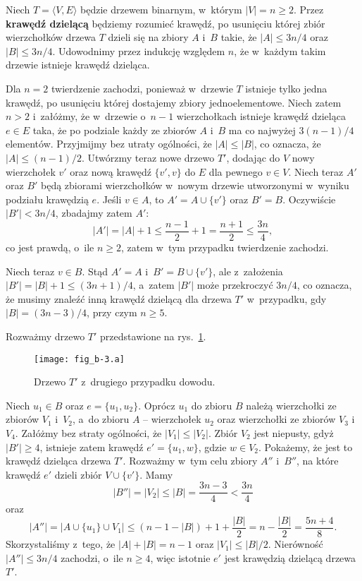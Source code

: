 
\subproblem %
Niech $T=\langle V,E\rangle$ będzie drzewem binarnym, w~którym $|V|=n\ge2$.
Przez \textbf{krawędź dzielącą} będziemy rozumieć krawędź, po usunięciu której zbiór wierzchołków drzewa $T$ dzieli się na zbiory $A$ i~$B$ takie, że $|A|\le3n/4$ oraz $|B|\le3n/4$.
Udowodnimy przez indukcję względem $n$, że w~każdym takim drzewie istnieje krawędź dzieląca.

Dla $n=2$ twierdzenie zachodzi, ponieważ w~drzewie $T$ istnieje tylko jedna krawędź, po usunięciu której dostajemy zbiory jednoelementowe.
Niech zatem $n>2$ i~załóżmy, że w~drzewie o~$n-1$ wierzchołkach istnieje krawędź dzieląca $e\in E$ taka, że po podziale każdy ze zbiorów $A$ i~$B$ ma co najwyżej $3(n-1)/4$ elementów.
Przyjmijmy bez utraty ogólności, że $|A|\le|B|$, co oznacza, że $|A|\le(n-1)/2$.
Utwórzmy teraz nowe drzewo $T'$, dodając do $V$ nowy wierzchołek $v'$ oraz nową krawędź $\{v',v\}$ do $E$ dla pewnego $v\in V$.
Niech teraz $A'$ oraz $B'$ będą zbiorami wierzchołków w~nowym drzewie utworzonymi w~wyniku podziału krawędzią $e$.
Jeśli $v\in A$, to $A'=A\cup\{v'\}$ oraz $B'=B$.
Oczywiście $|B'|<3n/4$, zbadajmy zatem $A'$:
\[
	|A'| = |A|+1 \le \frac{n-1}{2}+1 = \frac{n+1}{2} \le \frac{3n}{4},
\]
co jest prawdą, o~ile $n\ge2$, zatem w~tym przypadku twierdzenie zachodzi.

Niech teraz $v\in B$.
Stąd $A'=A$ i~$B'=B\cup \{v'\}$, ale z~założenia $|B'|=|B|+1\le(3n+1)/4$, a~zatem $|B'|$ może przekroczyć $3n/4$, co oznacza, że musimy znaleźć inną krawędź dzielącą dla drzewa $T'$ w~przypadku, gdy $|B|=(3n-3)/4$, przy czym $n\ge5$.

Rozważmy drzewo $T'$ przedstawione na rys.\ \ref{fig:B-3a}.
\begin{figure}[ht]
	\begin{center}
		\texttt{[image: fig\_b-3.a]}
	\end{center}
	\caption{Drzewo $T'$ z~drugiego przypadku dowodu.} \label{fig:B-3a}
\end{figure}
Niech $u_1\in B$ oraz $e=\{u_1,u_2\}$.
Oprócz $u_1$ do zbioru $B$ należą wierzchołki ze zbiorów $V_1$ i~$V_2$, a~do zbioru $A$ -- wierzchołek $u_2$ oraz wierzchołki ze zbiorów $V_3$ i~$V_4$.
Załóżmy bez straty ogólności, że $|V_1|\le|V_2|$.
Zbiór $V_2$ jest niepusty, gdyż $|B'|\ge4$, istnieje zatem krawędź $e'=\{u_1,w\}$, gdzie $w\in V_2$.
Pokażemy, że jest to krawędź dzieląca drzewa $T'$.
Rozważmy w~tym celu zbiory $A''$ i~$B''$, na które krawędź $e'$ dzieli zbiór $V\cup\{v'\}$.
Mamy
\[
	|B''| = |V_2| \le |B| = \frac{3n-3}{4} < \frac{3n}{4}
\]
oraz
\[
	|A''| = \bigl|A\cup\{u_1\}\cup V_1\bigr| \le (n-1-|B|)+1+\frac{|B|}{2} = n-\frac{|B|}{2} = \frac{5n+4}{8}.
\]
Skorzystaliśmy z~tego, że $|A|+|B|=n-1$ oraz $|V_1|\le|B|/2$.
Nierówność $|A''|\le3n/4$ zachodzi, o~ile $n\ge4$, więc istotnie $e'$ jest krawędzią dzielącą drzewa $T'$.

